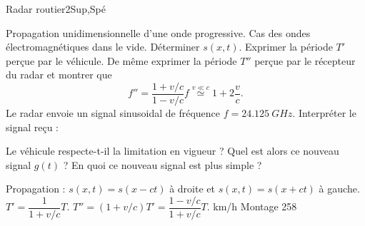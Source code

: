 \begin{exercise}{Radar routier}{2}{Sup,Spé}
\begin{questions}
    \questioncours Propagation unidimensionnelle d'une onde progressive. Cas des ondes électromagnétiques dans le vide. Déterminer $s(x,t)$.
    \question Exprimer la période $T'$ perçue par le véhicule.
    \question De même exprimer la période $T''$ perçue par le récepteur du radar et montrer que
    $$f'' = \dfrac{1 + v/c}{1 - v/c}f \stackrel{v \ll c}{\simeq} 1 + 2\dfrac{v}{c}.$$
    \question Le radar envoie un signal sinusoidal de fréquence $f = \SI{24.125}{GHz}$. Interpréter le signal reçu :
\begin{EnvUplevel}
    \centering
\end{EnvUplevel}
Le véhicule respecte-t-il la limitation en vigueur ?
    \question Quel est alors ce nouveau signal $g(t)$ ? En quoi ce nouveau signal est plus simple ?
\end{questions}
  

\end{exercise}

\begin{solution}
\begin{questions}
    \question Propagation : $s(x,t) = s(x - ct)$ à droite et $s(x,t) = s(x+ct)$ à gauche.
    \question $T' = \dfrac{1}{1+v/c}T$.
    \question $T'' = (1+v/c)T' = \dfrac{1-v/c}{1+v/c}T$.
     km/h
    \question Montage 258
\end{questions}
\end{solution}